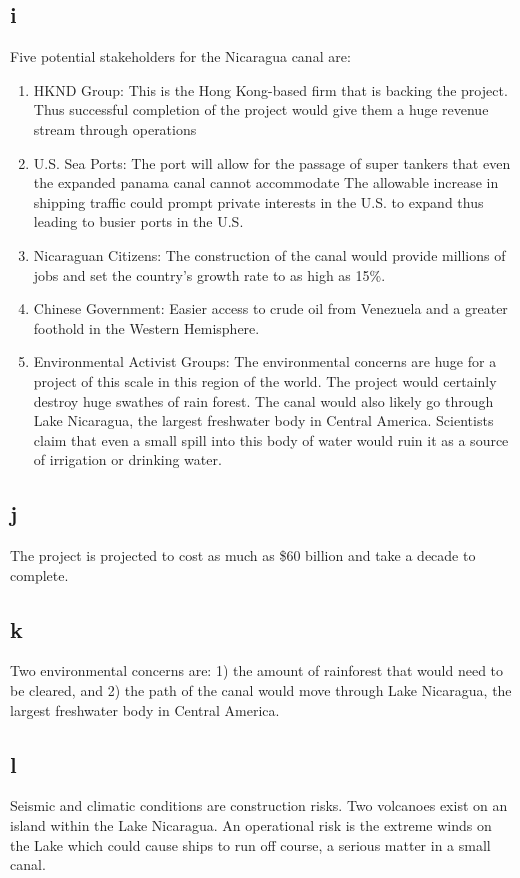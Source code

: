 \documentclass[12pt]{article} %
\begin{document}
	\subsection{i}
		Five potential stakeholders for the Nicaragua canal are:
		\begin{enumerate}
			\item HKND Group: This is the Hong Kong-based firm that is backing the project. Thus successful completion of the project would give them a huge revenue stream through operations
			\item U.S. Sea Ports: The port will allow for the passage of super tankers that even the expanded panama canal cannot accommodate The allowable increase in shipping traffic could prompt private interests in the U.S. to expand thus leading to busier ports in the U.S.
			\item Nicaraguan Citizens: The construction of the canal would provide millions of jobs and set the country's growth rate to as high as 15\%.
			\item Chinese Government: Easier access to crude oil from Venezuela and a greater foothold in the Western Hemisphere.
			\item Environmental Activist Groups: The environmental concerns are huge for a project of this scale in this region of the world. The project would certainly destroy huge swathes of rain forest. The canal would also likely go through Lake Nicaragua, the largest freshwater body in Central America. Scientists claim that even a small spill into this body of water would ruin it as a source of irrigation or drinking water.
		\end{enumerate}
		
	\subsection{j}
		The project is projected to cost as much as \$60 billion and take a decade to complete.
		
	\subsection{k}
		Two environmental concerns are: 1) the amount of rainforest that would need to be cleared, and 2) the path of the canal would move through Lake Nicaragua, the largest freshwater body in Central America.
		
	\subsection{l}
		Seismic and climatic conditions are construction risks. Two volcanoes exist on an island within the Lake Nicaragua. An operational risk is the extreme winds on the Lake which could cause ships to run off course, a serious matter in a small canal.
		
\end{document}
